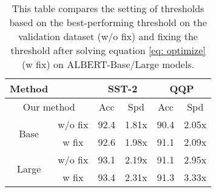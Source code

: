 \begin{table}[]  %
\centering
\small
\begin{tabular}{cccccc}
\hline
\textbf{Method}               & \textbf{}  & \multicolumn{2}{c}{\textbf{SST-2}} & \multicolumn{2}{c}{\textbf{QQP}} \\ \hline
\multicolumn{2}{c}{Our method}             & Acc             & Spd            & Acc            & Spd           \\ \hline
\multirow{2}{*}{Base}  & w/o fix & 92.4            & 1.81x             & 90.4           & 2.05x           \\
                              & w fix   & 92.6            & 1.98x             & 91.1           & 2.09x           \\ \hline
\multirow{2}{*}{Large} & w/o fix & 93.1            & 2.19x             & 91.1           & 2.95x           \\
                              & w fix   & 93.4            & 2.31x             & 91.3           & 3.33x           \\ \hline
\end{tabular}
\caption{This table compares the setting of thresholds based on the best-performing threshold on the validation dataset (w/o fix) and fixing the threshold after solving equation \ref{eq: optimize} (w fix) on ALBERT-Base/Large models.}
\label{tab:fixing_thresholds}
\end{table}